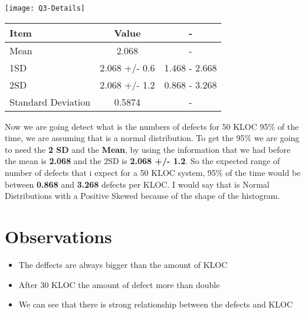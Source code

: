 \begin{center}
    \texttt{[image: Q3-Details]}    
\end{center}

\noindent

\begin{center}
    \begin{tabular}{|p{4cm} | c | c|}
        \hline
        Item & Value & - \\ [0.5ex] 
        \hline
        Mean & 2.068 & -  \\  
        \hline
        1SD & 2.068 +/- 0.6 & 1.468 - 2.668 \\
        \hline
        2SD & 2.068 +/- 1.2 & 0.868 - 3.268 \\
        \hline
        Standard Deviation & 0.5874 & -\\
        \hline
    \end{tabular}
\end{center}

\noindent\newline \newline
Now we are going detect what is the numbers of defects for 50 KLOC 95\% of the time, we are assuming that is a normal distribution.
\noindent\newline \newline
To get the 95\% we are going to need the \textbf{2 SD} and the \textbf{Mean}, by using the information that we had before the mean is \textbf{2.068} and the 2SD is \textbf{2.068 +/- 1.2}. So the expected range of number of defects that i expect for a 50 KLOC system, 95\% of the time would be between \textbf{0.868} and \textbf{3.268} defects per KLOC.
\noindent\newline \newline
I would say that is Normal Distributions with a Positive Skewed because of the shape of the histogram.

\pagebreak

\section{Observations}
\begin{itemize}
    \item The deffects are always bigger than the amount of KLOC 
    \item After 30 KLOC the amount of defect more than double
    \item We can see that there is strong relationship between the defects and KLOC 
\end{itemize}
\pagebreak

